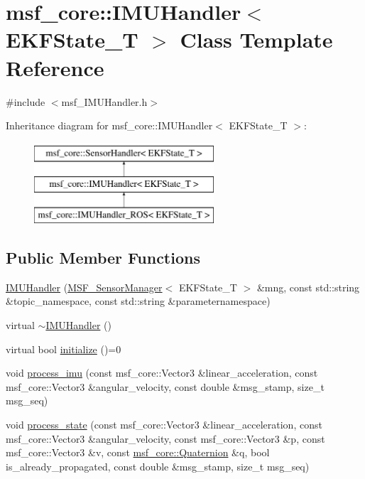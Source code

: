 \hypertarget{classmsf__core_1_1IMUHandler}{\section{msf\-\_\-core\-:\-:I\-M\-U\-Handler$<$ E\-K\-F\-State\-\_\-\-T $>$ Class Template Reference}
\label{classmsf__core_1_1IMUHandler}
}


{\ttfamily \#include $<$msf\-\_\-\-I\-M\-U\-Handler.\-h$>$}

Inheritance diagram for msf\-\_\-core\-:\-:I\-M\-U\-Handler$<$ E\-K\-F\-State\-\_\-\-T $>$\-:\begin{figure}[H]
\begin{center}
\leavevmode
\includegraphics[height=3.000000cm]{classmsf__core_1_1IMUHandler}
\end{center}
\end{figure}
\subsection*{Public Member Functions}
\begin{DoxyCompactItemize}
\item 
\hyperlink{classmsf__core_1_1IMUHandler_a41084ec0130edd4c1b2934defbd19fb4}{I\-M\-U\-Handler} (\hyperlink{classmsf__core_1_1MSF__SensorManager}{M\-S\-F\-\_\-\-Sensor\-Manager}$<$ E\-K\-F\-State\-\_\-\-T $>$ \&mng, const std\-::string \&topic\-\_\-namespace, const std\-::string \&parameternamespace)
\item 
virtual \hyperlink{classmsf__core_1_1IMUHandler_a35cd9d86a2178b9ad85f00ebd598baa8}{$\sim$\-I\-M\-U\-Handler} ()
\item 
virtual bool \hyperlink{classmsf__core_1_1IMUHandler_aa343ee8a9375a7c3ecf9a980cf0bc82d}{initialize} ()=0
\item 
void \hyperlink{classmsf__core_1_1IMUHandler_a6b977a9a49ea5d91c5c61cb063169535}{process\-\_\-imu} (const msf\-\_\-core\-::\-Vector3 \&linear\-\_\-acceleration, const msf\-\_\-core\-::\-Vector3 \&angular\-\_\-velocity, const double \&msg\-\_\-stamp, size\-\_\-t msg\-\_\-seq)
\item 
void \hyperlink{classmsf__core_1_1IMUHandler_a46cd980264fb5369147c575a31f1dcb2}{process\-\_\-state} (const msf\-\_\-core\-::\-Vector3 \&linear\-\_\-acceleration, const msf\-\_\-core\-::\-Vector3 \&angular\-\_\-velocity, const msf\-\_\-core\-::\-Vector3 \&p, const msf\-\_\-core\-::\-Vector3 \&v, const \hyperlink{namespacemsf__core_a044c525dd7800e2e2f4bb86fc565a7c7}{msf\-\_\-core\-::\-Quaternion} \&q, bool is\-\_\-already\-\_\-propagated, const double \&msg\-\_\-stamp, size\-\_\-t msg\-\_\-seq)
\end{DoxyCompactItemize}
